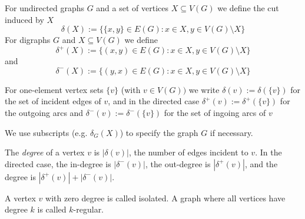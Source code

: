 % 
\begin{definition}
For undirected graphs $G$ and a set of vertices $X \subseteq V(G)$ we define the cut induced by $X$
$$\delta(X) := \{\{x, y\} \in E(G) : x \in X , y \in V(G) \setminus X\}$$
For digraphs $G$ and $X \subseteq V(G)$ we define 
$$\delta^+(X) := \{(x, y) \in E(G) : x \in X , y \in V(G) \setminus X\}$$ and
$$\delta^-(X) := \{(y, x) \in E(G) : x \in X , y \in V(G) \setminus X\}$$
 
For one-element vertex sets $\{v\}$ (with $v \in V(G))$ we write $\delta(v) :=\delta(\{v\})$ for the set of incident 
edges of $v$, and in the directed case 
$ \delta^+(v) := \delta^+(\{v\})$ for the outgoing arcs and $\delta^-(v) := \delta^-(\{v\})$ for the set of ingoing 
arcs of $v$
\end{definition}
We use subscripts (e.g. $\delta_G(X)$) to specify the graph $G$ if necessary.
\begin{definition}
The \textit{degree} of a vertex $v$ is $|\delta(v)|$, the number of edges incident to $v$. In the directed 
case, the in-degree is $|\delta^-(v)|$, the out-degree is $|\delta^+(v)|$, and the degree is 
$|\delta^+(v)|+ |\delta^-(v)|$.
\end{definition}
A vertex $v$ with zero degree is called isolated. A graph where all vertices have degree $k$ is called $k$-regular.

